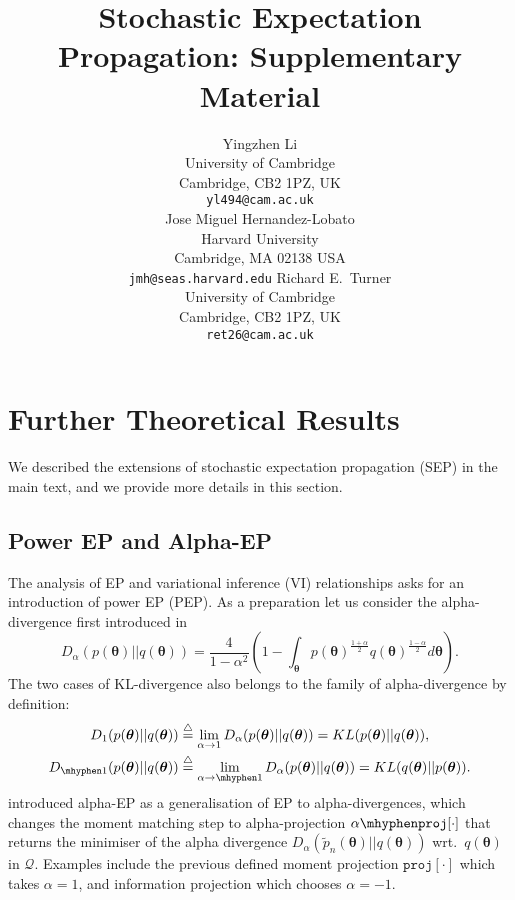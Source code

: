 \documentclass{article} %
\title{Stochastic Expectation Propagation: Supplementary Material}
\author{
Yingzhen Li \\
University of Cambridge\\
Cambridge, CB2 1PZ, UK \\
\texttt{yl494@cam.ac.uk} \\
\And
Jose Miguel Hernandez-Lobato\\
Harvard University \\
Cambridge, MA 02138 USA \\
\texttt{jmh@seas.harvard.edu}
\And
Richard E.~Turner \\
University of Cambridge\\
Cambridge, CB2 1PZ, UK \\
\texttt{ret26@cam.ac.uk} \\
}
\begin{document}
\maketitle

\appendix

\section{Further Theoretical Results}
We described the extensions of stochastic expectation propagation (SEP) in the main text, and we provide more details in this section.
\subsection{Power EP and Alpha-EP}
The analysis of EP and variational inference (VI) relationships asks for an introduction of power EP (PEP). As a preparation let us consider the alpha-divergence first introduced in \cite{amari:ig1985}
\begin{equation}
D_{\alpha}(p(\bm{\theta}) || q(\bm{\theta})) = \frac{4}{1 - \alpha^2} 
		\left( 1 - \int_{\bm{\theta}} p(\bm{\theta})^{ \frac{1+\alpha}{2}} q(\bm{\theta})^{ \frac{1- \alpha}{2}} d\bm{\theta} \right).
\end{equation} 
The two cases of KL-divergence also belongs to the family of alpha-divergence by definition:
\begin{align}
D_{1}(p(\bm{\theta})||q(\bm{\theta})) &\buildrel\triangle\over = \lim_{\alpha \rightarrow 1} D_{\alpha}(p(\bm{\theta})||q(\bm{\theta}))  = KL(p(\bm{\theta}) || q(\bm{\theta})), \\
D_{ \mhyphen 1}(p(\bm{\theta})||q(\bm{\theta})) &\buildrel\triangle\over = \lim_{\alpha \rightarrow \mhyphen 1} D_{\alpha}(p(\bm{\theta}) || q(\bm{\theta}))  = KL(q(\bm{\theta}) || p(\bm{\theta})).
\end{align}
\cite{minka:powerep} introduced alpha-EP as a generalisation of EP to alpha-divergences, which changes the moment matching step to alpha-projection $\alpha \mhyphen \mathtt{proj}[\cdot]$ \cite{amari:alpha_proj} that returns the minimiser of the alpha divergence $D_{\alpha}(\tilde{p}_n(\bm{\theta}) || q(\bm{\theta}))$ wrt.~$q(\bm{\theta})$ in $\mathcal{Q}$. Examples include the previous defined moment projection $\mathtt{proj}[\cdot]$ which takes $\alpha = 1$, and information projection which chooses $\alpha = -1$. 
\end{document}
